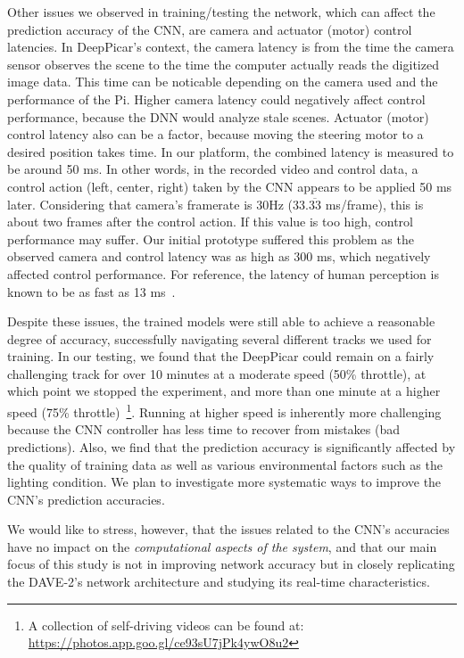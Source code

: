 Other issues we observed in training/testing the network, which
can affect the prediction accuracy of the CNN, are camera and actuator
(motor) control latencies. In DeepPicar's
context, the camera latency is from the time the camera
sensor observes the scene to the time the computer actually reads the
digitized image data. This time can be noticable depending on the camera 
used and the performance of the Pi. Higher camera latency could
negatively affect control performance, because the DNN would analyze
stale scenes. Actuator (motor) control latency also can be a
factor, because moving the steering motor to a desired position takes
time. 
In our platform, the combined latency is measured to be around
50 ms. In other words, in the recorded video and control data, a
control action (left, center, right) taken by the CNN appears to be
applied 50 ms later. Considering that camera's framerate is 30Hz
(33.$\overline{\mbox{33}}$ ms/frame), this is about two frames after the 
control action.
If this value is too high, control performance may suffer.
Our initial prototype suffered this problem as the observed camera and
control latency was as high as 300 ms, which negatively affected
control performance.
For reference, the latency of human perception is known to be as fast
as 13 ms~\cite{ThomasBurger2015}. 

Despite these issues, the trained models were still able to
achieve a reasonable degree of accuracy, successfully navigating
several different tracks we used for training. In our testing, we found 
that the DeepPicar could remain on a fairly challenging track for over 
10 minutes at a moderate speed (50\% throttle), at which point we stopped
the experiment, and more than one minute at a higher speed (75\%
throttle)~\footnote{A collection of self-driving videos can be found
  at: \url{https://photos.app.goo.gl/ce93sU7jPk4ywO8u2}}. Running at
higher speed is inherently more challenging because the CNN controller
has less time to recover from mistakes (bad predictions).  Also, we
find that the prediction accuracy is significantly affected by the
quality of training data as well as various environmental factors such
as the lighting condition. We plan to investigate more systematic ways
to improve the CNN's prediction accuracies.

We would like to stress, however, that the issues related to the
CNN's accuracies have no impact on the \emph{computational 
aspects of the system}, and that our main focus of this study is
not in improving network accuracy but in closely replicating the
DAVE-2's network architecture and studying its real-time
characteristics.
